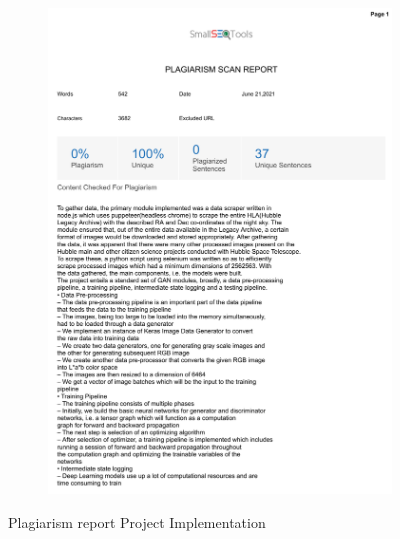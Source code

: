 \documentclass[oneside,a4paper,12pt]{report}
\begin{document}
\begin{appendices}
\begin{figure}
	\begin{subfigure}[H]{\textwidth}
		\centering
    	\includegraphics[scale=0.7, page=1]{plagiarism/project_implementation.pdf}
    \end{subfigure}
 \caption{Plagiarism report Project Implementation}
    \label{PlagiarismImplementation}
\end{figure}
\begin{figure}\ContinuedFloat
    \begin{subfigure}[H]{\textwidth}
    	\centering

\end{subfigure}
\end{figure}
\end{appendices}
\end{document}
